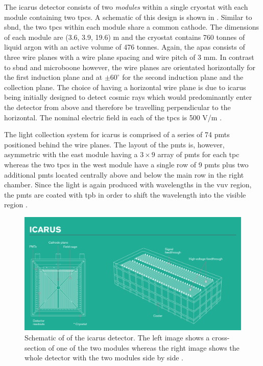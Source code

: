 The \gls{icarus} detector consists of two \textit{modules} within a single cryostat with each module containing two \glspl{tpc}. A schematic of this design is shown in . Similar to \gls{sbnd}, the two \glspl{tpc} within each module share a common cathode. The dimensions of each module are (3.6, 3.9, 19.6) m and the cryostat contains 760 tonnes of liquid argon with an active volume of 476 tonnes.  Again, the \glspl{apa} consists of three wire planes with a wire plane spacing and wire pitch of 3 mm. In contrast to \gls{sbnd} and \gls{microboone} however, the wire planes are orientated horizontally for the first induction plane and at $\pm 60^\circ$ for the second induction plane and the collection plane. The choice of having a horizontal wire plane is due to \gls{icarus} being initially designed to detect cosmic rays which would predominantly enter the detector from above and therefore be travelling perpendicular to the horizontal. The nominal electric field in each of the \glspl{tpc} is 500 V/m \cite{SBN_Proposal}. 

The light collection system for \gls{icarus} is comprised of a series of 74 \glspl{pmt} positioned behind the wire planes. The layout of the \glspl{pmt} is, however, asymmetric with the east module having a $3 \times 9$ array of \glspl{pmt} for each \gls{tpc} whereas the two \glspl{tpc} in the west module have a single row of 9 \glspl{pmt} plus two additional \glspl{pmt} located centrally above and below the main row in the right chamber. Since the light is again produced with wavelengths in the \gls{vuv} region, the \glspl{pmt} are coated with \gls{tpb} in order to shift the wavelength into the visible region \cite{SBN_Proposal}.  

\begin{figure}[h!]
    \centering
    \includegraphics[width = \hugefigwidth]{figures-chap3/icarus.png}
    \caption[ICARUS detector.]{Schematic of of the \gls{icarus} detector. The left image shows a cross-section of one of the two modules whereas the right image shows the whole detector with the two modules side by side \cite{ICARUS_image}.}
    \label{fig:icarus}
\end{figure}

